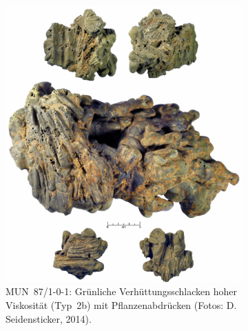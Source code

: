 \begin{figure}[p]
	\centering
	\begin{subfigure}{\columnwidth}	
		\centering
		\includegraphics[height = .4\textheight]{fig/MUN87-1-0-1_SchlackeOrganik.jpg}
		\caption{MUN~87/1-0-1: Grünliche Verhüttungsschlacken hoher Viskosität (Typ~2b) mit Pflanzenabdrücken (Fotos: D. Seidensticker, 2014).}
		\label{fig:MUN87-1_SchlackeOrganik}
	\end{subfigure}\hfill
	\begin{subfigure}{\columnwidth}
		\centering

\end{subfigure}
\end{figure}
